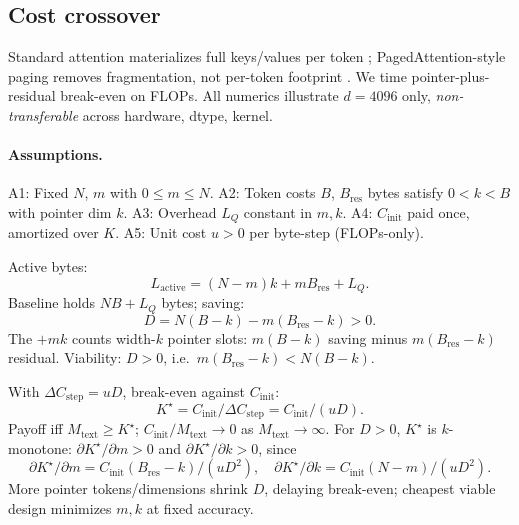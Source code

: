 \subsection{Cost crossover}
\label{sec:cost}

Standard attention materializes full keys/values per token \cite{vaswani2017attention}; PagedAttention-style paging removes fragmentation, not per-token footprint \cite{kwon2023pagedattention}. We time pointer-plus-residual break-even on FLOPs. All numerics illustrate $d=4096$ only, \emph{non-transferable} across hardware, dtype, kernel.

\paragraph{Assumptions.} A1: Fixed $N$, $m$ with $0 \le m \le N$. A2: Token costs $B$, $B_{\mathrm{res}}$ bytes satisfy $0 < k < B$ with pointer dim $k$. A3: Overhead $L_Q$ constant in $m,k$. A4: $C_{\mathrm{init}}$ paid once, amortized over $K$. A5: Unit cost $u>0$ per byte-step (FLOPs-only).

Active bytes:
\begin{equation}
L_{\mathrm{active}} = (N-m)k + mB_{\mathrm{res}} + L_Q.
\label{eq:Lactive}
\end{equation}
Baseline holds $NB+L_Q$ bytes; saving:
\begin{equation}
D = N(B-k) - m(B_{\mathrm{res}}-k) > 0.
\label{eq:viability}
\end{equation}
The $+mk$ counts width-$k$ pointer slots: $m(B-k)$ saving minus $m(B_{\mathrm{res}}-k)$ residual. Viability: $D>0$, i.e.\ $m(B_{\mathrm{res}}-k)<N(B-k)$.

With $\Delta C_{\mathrm{step}}=uD$, break-even against $C_{\mathrm{init}}$:
\begin{equation}
K^{\star} = C_{\mathrm{init}} / \Delta C_{\mathrm{step}} = C_{\mathrm{init}} / (uD).
\label{eq:Kstar}
\end{equation}
Payoff iff $M_{\mathrm{text}} \ge K^{\star}$; $C_{\mathrm{init}}/M_{\mathrm{text}}\to0$ as $M_{\mathrm{text}}\to\infty$. For $D>0$, $K^{\star}$ is $k$-monotone: $\partial K^{\star}/\partial m>0$ and $\partial K^{\star}/\partial k>0$, since
\begin{equation}
\partial K^{\star}/\partial m = C_{\mathrm{init}}(B_{\mathrm{res}}-k)/(uD^2), \quad \partial K^{\star}/\partial k = C_{\mathrm{init}}(N-m)/(uD^2).
\label{eq:monotone}
\end{equation}
More pointer tokens/dimensions shrink $D$, delaying break-even; cheapest viable design minimizes $m,k$ at fixed accuracy.

